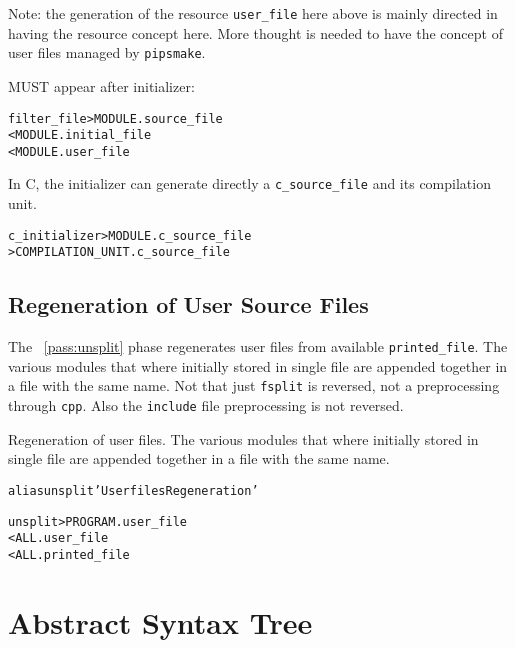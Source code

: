 \documentclass[a4paper]{report}
\newenvironment{PipsMake}{\begin{alltt}}{\end{alltt}}
\newcommand{\PipsPassRef}[1]{\texttt{\detokenize{#1}}~\ref{pass:#1}}
\newenvironment{PipsPass}[1]{\label{pass:#1}}{}
\newcommand{\Pipsmake}{\texttt{pipsmake}}
\begin{document}
Note: the generation of the resource \verb|user_file| here above is mainly
directed in having the resource concept here. More thought is needed to
have the concept of user files managed by \Pipsmake{}.

MUST appear after initializer:

\begin{PipsMake}
filter_file                     > MODULE.source_file
                < MODULE.initial_file
                < MODULE.user_file
\end{PipsMake}


In C, the initializer can generate directly a \verb|c_source_file| and
its compilation unit.

\begin{PipsMake}
c_initializer                     > MODULE.c_source_file
                                  > COMPILATION_UNIT.c_source_file
\end{PipsMake}


\section{Regeneration of User Source Files}
\label{sec:regen-user-source}


The \PipsPassRef{unsplit} phase regenerates user files from available
\verb|printed_file|. The various modules that where initially stored in
single file are appended together in a file with the same name. Not that
just \texttt{fsplit} is reversed, not a preprocessing through \texttt{cpp}.
Also the \texttt{include} file preprocessing is not reversed.


\begin{PipsPass}{unsplit}
Regeneration of user files. The various modules that where initially stored in
single file are appended together in a file with the same name.
\end{PipsPass}
\begin{PipsMake}

alias unsplit 'User files Regeneration'

unsplit                         > PROGRAM.user_file
                < ALL.user_file
                < ALL.printed_file
\end{PipsMake}

\chapter{Abstract Syntax Tree}
\label{section-abstract-syntax-tree}
\end{document}
